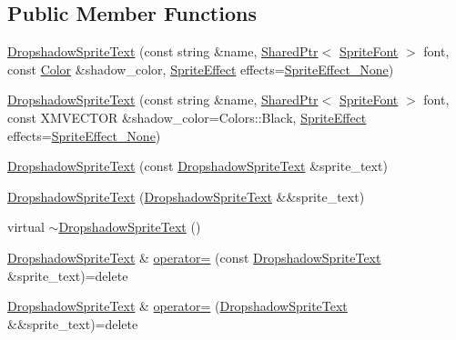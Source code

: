 \subsection*{Public Member Functions}
\begin{DoxyCompactItemize}
\item 
\hyperlink{classmage_1_1_dropshadow_sprite_text_a10b134e06d6bcf04168005630a2934f0}{Dropshadow\+Sprite\+Text} (const string \&name, \hyperlink{namespacemage_a1e01ae66713838a7a67d30e44c67703e}{Shared\+Ptr}$<$ \hyperlink{classmage_1_1_sprite_font}{Sprite\+Font} $>$ font, const \hyperlink{structmage_1_1_color}{Color} \&shadow\+\_\+color, \hyperlink{namespacemage_a9cfe18123066ba4236f548f9de75d881}{Sprite\+Effect} effects=\hyperlink{namespacemage_a9cfe18123066ba4236f548f9de75d881af3c275fbfacfe174da928b2f24dfa515}{Sprite\+Effect\+\_\+\+None})
\item 
\hyperlink{classmage_1_1_dropshadow_sprite_text_aad4f7653cdc925c12cfc3a4915552efb}{Dropshadow\+Sprite\+Text} (const string \&name, \hyperlink{namespacemage_a1e01ae66713838a7a67d30e44c67703e}{Shared\+Ptr}$<$ \hyperlink{classmage_1_1_sprite_font}{Sprite\+Font} $>$ font, const X\+M\+V\+E\+C\+T\+OR \&shadow\+\_\+color=Colors\+::\+Black, \hyperlink{namespacemage_a9cfe18123066ba4236f548f9de75d881}{Sprite\+Effect} effects=\hyperlink{namespacemage_a9cfe18123066ba4236f548f9de75d881af3c275fbfacfe174da928b2f24dfa515}{Sprite\+Effect\+\_\+\+None})
\item 
\hyperlink{classmage_1_1_dropshadow_sprite_text_af0a9422a32ed8962d6c691fe76f44c30}{Dropshadow\+Sprite\+Text} (const \hyperlink{classmage_1_1_dropshadow_sprite_text}{Dropshadow\+Sprite\+Text} \&sprite\+\_\+text)
\item 
\hyperlink{classmage_1_1_dropshadow_sprite_text_a238b873f7b4d818cc3640e8f363f760e}{Dropshadow\+Sprite\+Text} (\hyperlink{classmage_1_1_dropshadow_sprite_text}{Dropshadow\+Sprite\+Text} \&\&sprite\+\_\+text)
\item 
virtual \hyperlink{classmage_1_1_dropshadow_sprite_text_a561b1be59d05bccb680969be792c0e28}{$\sim$\+Dropshadow\+Sprite\+Text} ()
\item 
\hyperlink{classmage_1_1_dropshadow_sprite_text}{Dropshadow\+Sprite\+Text} \& \hyperlink{classmage_1_1_dropshadow_sprite_text_a83846227264396ee5b6ca44304bc404a}{operator=} (const \hyperlink{classmage_1_1_dropshadow_sprite_text}{Dropshadow\+Sprite\+Text} \&sprite\+\_\+text)=delete
\item 
\hyperlink{classmage_1_1_dropshadow_sprite_text}{Dropshadow\+Sprite\+Text} \& \hyperlink{classmage_1_1_dropshadow_sprite_text_aea70f005fd9eae94aee9da27aa54534b}{operator=} (\hyperlink{classmage_1_1_dropshadow_sprite_text}{Dropshadow\+Sprite\+Text} \&\&sprite\+\_\+text)=delete

\end{DoxyCompactItemize}

